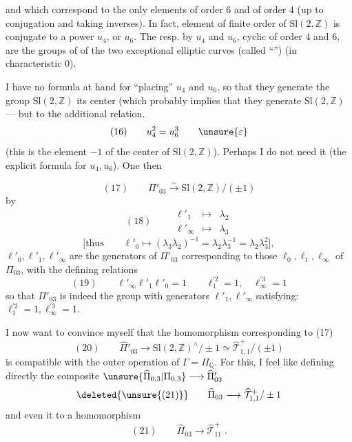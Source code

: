 
and which correspond to the only elements of order 6 and of order 4 (up to conjugation and taking inverses). In fact,  element of finite order of $\mathrm{Sl}(2,\mathbb Z)$ is conjugate to a power   $u_4$, or $u_6$. The   resp. by $u_4$ and $u_6$, cyclic of order 4 and 6, are the groups of  of the two exceptional elliptic curves (called ``'') (in characteristic 0).

 I have no formula at hand for ``placing''  $u_4$ and $u_6$, so that they generate the group $\mathrm{Sl}(2,\mathbb Z)$  its center (which probably implies that they generate $\mathrm{Sl}(2,\mathbb Z)$ --- but  to the additional relation. 
\[
(16)\qquad u_4^2=u_6^3\qquad\unsure{\varepsilon}
\]
(this is   the element $-1$ of the center of $\mathrm{Sl}(2,\mathbb Z)$). Perhaps I do not need it (the explicit formula for $u_4,u_6$). One then 


\[
(17)\qquad \Pi'_{03}\xrightarrow{\sim}\mathrm{Sl}(2,\mathbb Z)/(\pm1)
\]
by
\[
(18)\qquad
\begin{array}{rcl}
\ell'_1&\longmapsto&\lambda_2\\
\ell'_\infty&\longmapsto&\lambda_3
\end{array}
\]
\[
\bigl[\text{thus}\qquad\ell'_0\longmapsto(\lambda_3\lambda_2)^{-1}
=\lambda_2\lambda_3^{-1}=\lambda_2\lambda_3^2\bigr],
\]
 $\ell'_0,\ell'_1,\ell'_\infty$ are the generators of $\Pi'_{03}$ corresponding to those $\ell_0,\ell_1,\ell_\infty$ of $\Pi_{03}$, with the defining relations
\[
(19)\qquad\ell'_\infty\ell'_1\ell'_0=1\qquad
\ell_1^{\prime 2}=1,\quad\ell_\infty^{\prime 3}=1
\]
so that $\Pi'_{03}$ is indeed the group  with generators $\ell'_1,\ell'_\infty$ satisfying: $\ell_1^{\prime 2}=1,\ell_\infty^{\prime 3}=1$.

I now want to convince myself that the homomorphism corresponding to (17)
\[
(20)\qquad\widehat{\Pi}'_{03}\longrightarrow
\mathrm{Sl}(2,\mathbb Z)^\wedge/\pm1\simeq
\widehat{\mathcal T}_{1,1}^{+}/(\pm1)
\]
is compatible with the outer operation of $\Gamma=\Pi_{\mathbb Q}$. For this, I feel like defining directly the composite  $\unsure{\widehat{\Pi}_{0,3}|\Pi_{0,3}}\longrightarrow\widehat{\Pi}'_{03}$
\[
\text{\deleted{\unsure{(21)}}}\qquad\widehat{\Pi}_{03}\longrightarrow\widehat{\mathcal T}_{1,1}^{+}/\pm1
\]
and even  it to a homomorphism
\[
(21)\qquad\widehat{\Pi}_{03}\longrightarrow\widehat{\mathcal T}_{11}^{+}\;.
\]

